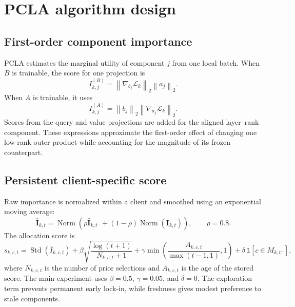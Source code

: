 \documentclass[11pt,a4paper]{article}
\begin{document}
\section{PCLA algorithm design}

\subsection{First-order component importance}

PCLA estimates the marginal utility of component $j$ from one local batch.
When $B$ is trainable, the score for one projection is
\begin{equation}
  I^{(B)}_{k,j}=\left\|\nabla_{b_j}\mathcal{L}_k\right\|_2
                    \left\|a_j\right\|_2 .
  \label{eq:importance-b}
\end{equation}
When $A$ is trainable, it uses
\begin{equation}
  I^{(A)}_{k,j}=\left\|b_j\right\|_2
                    \left\|\nabla_{a_j}\mathcal{L}_k\right\|_2 .
  \label{eq:importance-a}
\end{equation}
Scores from the query and value projections are added for the aligned
layer--rank component. These expressions approximate the first-order effect of
changing one low-rank outer product while accounting for the magnitude of its
frozen counterpart.

\subsection{Persistent client-specific score}

Raw importance is normalized within a client and smoothed using an exponential
moving average:
\begin{equation}
  \bar{\mathbf I}_{k,t} =
  \operatorname{Norm}\!\left(
  \rho\bar{\mathbf I}_{k,t^-}+(1-\rho)\operatorname{Norm}(\mathbf I_{k,t})
  \right),
  \qquad \rho=0.8 .
\end{equation}
The allocation score is
\begin{equation}
 s_{k,c,t} =
 \operatorname{Std}(\bar I_{k,c,t})
 +\beta\sqrt{\frac{\log(t+1)}{N_{k,c,t}+1}}
 +\gamma\min\!\left(\frac{A_{k,c,t}}{\max(t-1,1)},1\right)
 +\delta\,\mathbb{1}[c\in M_{k,t^-}],
 \label{eq:score}
\end{equation}
where $N_{k,c,t}$ is the number of prior selections and $A_{k,c,t}$ is the
age of the stored score. The main experiment uses $\beta=0.5$,
$\gamma=0.05$, and $\delta=0$. The exploration term prevents permanent early
lock-in, while freshness gives modest preference to stale components.
\end{document}
